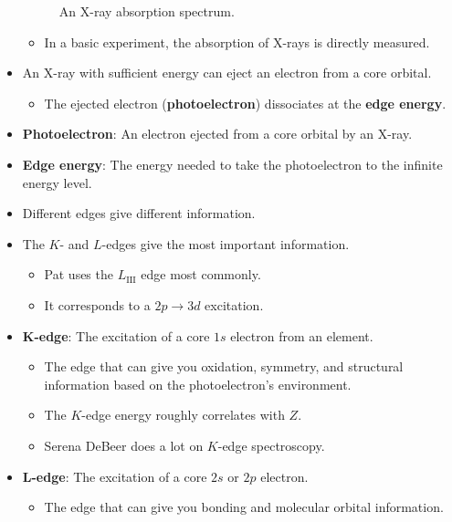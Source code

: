 \documentclass[../notes.tex]{subfiles}
\begin{document}
\begin{itemize}
\begin{figure}[h!]
        \caption{An X-ray absorption spectrum.}
        \label{fig:XASspectrum}
    \end{figure}
    \begin{itemize}
        \item In a basic experiment, the absorption of X-rays is directly measured.
    \end{itemize}
    \item An X-ray with sufficient energy can eject an electron from a core orbital.
    \begin{itemize}
        \item The ejected electron (\textbf{photoelectron}) dissociates at the \textbf{edge energy}.
    \end{itemize}
    \item \textbf{Photoelectron}: An electron ejected from a core orbital by an X-ray.
    \item \textbf{Edge energy}: The energy needed to take the photoelectron to the infinite energy level.
    \item Different edges give different information.
    \item The $K$- and $L$-edges give the most important information.
    \begin{itemize}
        \item Pat uses the $L_\text{III}$ edge most commonly.
        \item It corresponds to a $2p\to 3d$ excitation.
    \end{itemize}
    \item \textbf{$\bm{K}$-edge}: The excitation of a core $1s$ electron from an element.
    \begin{itemize}
        \item The edge that can give you oxidation, symmetry, and structural information based on the photoelectron's environment.
        \item The $K$-edge energy roughly correlates with $Z$.
        \item Serena DeBeer does a lot on $K$-edge spectroscopy.
    \end{itemize}
    \item \textbf{$\bm{L}$-edge}: The excitation of a core $2s$ or $2p$ electron.
    \begin{itemize}
        \item The edge that can give you bonding and molecular orbital information.

\end{itemize}
\end{itemize}
\end{document}
